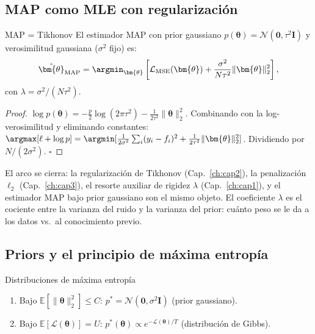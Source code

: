 \subsection{MAP como MLE con regularización}
\label{subsec:map}

\begin{proposicion}{MAP = Tikhonov}
\label{prop:map_l2}
El estimador MAP con prior gaussiano
$p(\bm{\theta}) = \mathcal{N}(\bm{0},\tau^2\bm{I})$ y verosimilitud
gaussiana ($\sigma^2$ fijo) es:
\begin{equation}
  \hat{\bm{\theta}}_{\text{MAP}}
  = \argmin_{\bm{\theta}}\left[\mathcal{L}_{\text{MSE}}(\bm{\theta})
  + \frac{\sigma^2}{N\tau^2}\|\bm{\theta}\|_2^2\right],
  \label{eq:map}
\end{equation}
con $\lambda = \sigma^2/(N\tau^2)$.
\end{proposicion}

\begin{proof}
$\log p(\bm{\theta}) = -\frac{p}{2}\log(2\pi\tau^2) -
\frac{1}{2\tau^2}\|\bm{\theta}\|_2^2$. Combinando con la
log-verosimilitud y eliminando constantes:
$\argmax[\ell + \log p] = \argmin[\frac{1}{2\sigma^2}\sum_i(y_i-f_i)^2
+ \frac{1}{2\tau^2}\|\bm{\theta}\|_2^2]$. Dividiendo por
$N/(2\sigma^2)$. $\square$
\end{proof}

El arco se cierra: la regularización de Tikhonov (Cap.~\ref{ch:cap2}),
la penalización $\ell_2$ (Cap.~\ref{ch:cap3}), el resorte auxiliar de
rigidez $\lambda$ (Cap.~\ref{ch:cap1}), y el estimador MAP bajo prior
gaussiano son el mismo objeto. El coeficiente $\lambda$ es el cociente
entre la varianza del ruido y la varianza del prior: cuánto peso se le
da a los datos vs.\ al conocimiento previo.

\subsection{Priors y el principio de máxima entropía}
\label{subsec:maxent}

\begin{proposicion}{Distribuciones de máxima entropía}
\label{prop:maxent}
\begin{enumerate}
  \item Bajo $\mathbb{E}[\|\bm{\theta}\|_2^2] \leq C$:
        $p^* = \mathcal{N}(\bm{0},\sigma^2\bm{I})$ (prior gaussiano).
  \item Bajo $\mathbb{E}[\mathcal{L}(\bm{\theta})] = U$:
        $p^*(\bm{\theta}) \propto e^{-\mathcal{L}(\bm{\theta})/T}$
        (distribución de Gibbs).
\end{enumerate}
\end{proposicion}

